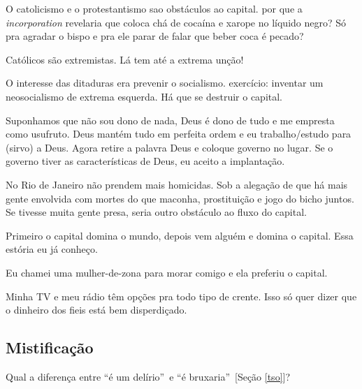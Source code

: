 \documentclass[12pt,a4paper]{article}
\begin{document}
O catolicismo e o
protestantismo sao obst\'aculos ao capital. por que a \emph{incorporation}
 revelaria que coloca ch\'a de coca\'ina e xarope no l\'iquido negro? S\'o pra
agradar o bispo e pra ele parar de falar que beber coca \'e pecado?

		\begin{flushright}
		\end{flushright}

Cat\'olicos s\~ao extremistas. L\'a tem at\'e a extrema un\c{c}\~ao!

O interesse das ditaduras era prevenir o socialismo. exerc\'icio: inventar
 um neosocialismo de extrema esquerda. H\'a que se destruir o capital.

 Suponhamos que n\~ao sou dono de nada, Deus \'e dono de tudo e me empresta
como usufruto. Deus mant\'em tudo em perfeita ordem e eu trabalho/estudo
para (sirvo) a Deus. Agora retire a palavra Deus e coloque governo no
lugar. Se o governo tiver as caracter\'isticas de Deus, eu aceito a
implanta\c{c}\~ao.

		\begin{flushright}
		\end{flushright}

No Rio de Janeiro n\~ao prendem mais homicidas. Sob a alega\c{c}\~ao de que h\'a mais gente
envolvida com mortes do que maconha, prostitui\c{c}\~ao e jogo do bicho
juntos.
Se tivesse muita gente presa, seria outro obst\'aculo ao fluxo do capital.

Primeiro o capital domina o mundo, depois vem algu\'em e domina o capital.
 Essa est\'oria eu j\'a conhe\c{c}o.

Eu chamei uma mulher-de-zona para morar comigo e ela preferiu o capital.

		\begin{flushright}
		\end{flushright}

Minha TV e meu r\'adio t\^em op\c{c}\~oes pra todo tipo de crente. Isso s\'o quer dizer que o dinheiro dos fieis est\'a bem disperdi\c{c}ado.

		\subsection{Mistifica\c{c}\~ao}
			\begin{flushright}
			\end{flushright}

			Qual a diferen\c{c}a entre \textquotedblleft\'e um del\'irio\textquotedblright\, e \textquotedblleft\'e bruxaria\textquotedblright\, [Se\c{c}\~ao \ref{tso}]?
\end{document}
